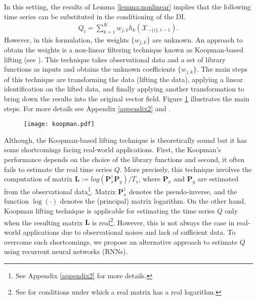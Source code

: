 In this setting, the results of Lemma \ref{lemma:nonlinear} implies that the following time series can be substituted in the conditioning of the DI. 
\begin{align}
    Q_t = \sum_{k=1}^K w_{j,k} h_k(\mathcal{X}_{-\{i\},t-1}).
\end{align}
However, in this formulation, the weights $\{w_{j,k}\}$ are unknown. 
An approach to obtain the weights is a non-linear filtering technique known as Koopman-based lifting (see \citet{koopman1931hamiltonian}). 
This technique takes observational data and a set of library functions as inputs and obtains the unknown coefficients $\{w_{j,k}\}$.
The main steps of this technique are transforming the data (lifting the data),  applying a linear identification on the lifted data, and finally applying another transformation to bring down the results into the original vector field.  Figure \ref{fig:koopman} illustrates the main steps. For more details see Appendix \ref{appendix2} and \citet{mauroy2019koopman}. 
\begin{figure}[h]
\centering
\texttt{[image: koopman.pdf]}
\label{fig:koopman}
\end{figure}

Although, the Koopman-based lifting technique is theoretically sound but it has some shortcomings facing real-world applications.
First, the Koopman's performance depends on the choice of the library functions and second, it often fails to estimate the real time series $Q$.
More precisely, this technique involves the computation of matrix $\textbf{L}:=log(\textbf{P}_x^{\dagger}\textbf{P}_y)/T_s$, where $\textbf{P}_x$ and $\textbf{P}_y$ are estimated from the observational data\footnote{See Appendix \ref{appendix2} for more details.}.
Matrix $\textbf{P}_x^{\dagger}$ denotes the pseudo-inverse, and the function $\log(\cdot)$ denotes the (principal) matrix logarithm.
On the other hand, Koopman lifting technique is applicable for estimating the time series $Q$ only when the resulting matrix $\textbf{L}$ is real\footnote{See \citet{culver1966existence} for conditions under which a real matrix has a real logarithm.}.
However, this is not always the case in real-world applications due to observational noises and lack of sufficient data. 
To overcome such shortcomings, we propose an alternative approach to estimate $Q$ using recurrent neural networks (RNNs).

